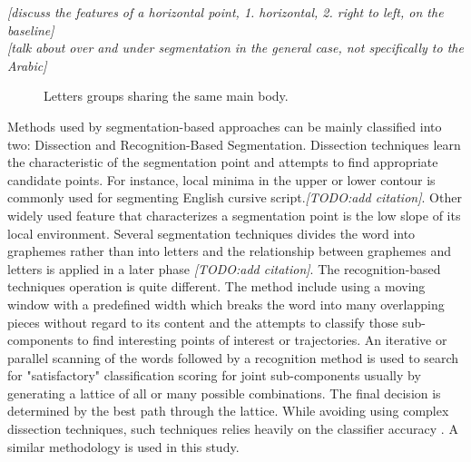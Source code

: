 \documentclass[journal,compsoc]{IEEEtran}
\begin{document}
\emph{[discuss the features of a horizontal point, 1. horizontal, 2. right to left, on the baseline]}\\


\emph{[talk about over and under segmentation in the general case, not specifically to the Arabic]}\\

\begin{figure}
\centering
    \caption{Letters groups sharing the same main body.}
   \label{fig:same_main_body_letters}
\end{figure}

Methods used by segmentation-based approaches can be mainly classified into two: Dissection and Recognition-Based Segmentation. Dissection techniques learn the characteristic of the segmentation point and attempts to find appropriate candidate points. For instance, local minima in the upper or lower contour is commonly used for segmenting English cursive script.\emph{[TODO:add citation]}. Other widely used feature that characterizes a segmentation point is the low slope of its local environment. Several segmentation techniques divides the word into graphemes rather than into letters and the relationship between graphemes and letters is applied in a later phase \emph{[TODO:add citation]}. The recognition-based techniques operation is quite different. The method include using a moving window with a predefined width which breaks the word into many overlapping pieces without regard to its content and the attempts to classify those sub-components to find interesting points of interest or trajectories. An iterative or parallel scanning of the words followed by a recognition method is used to search for "satisfactory" classification scoring for joint sub-components usually by generating a lattice of all or many possible combinations. The final decision is determined by the best path through the lattice. While avoiding using complex dissection techniques, such techniques relies heavily on the classifier accuracy \cite{casey1996survey}. A similar methodology is used in this study.\\
\end{document}
